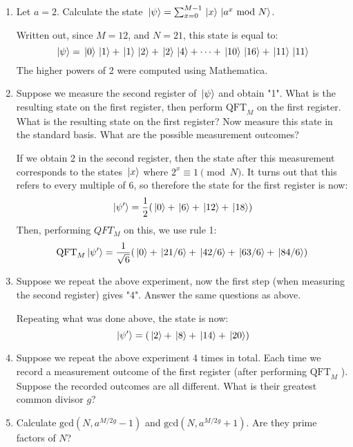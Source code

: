 \documentclass[10pt]{article}
\begin{document}
	\begin{enumerate}[label=\alph*)]
		\item Let \( a = 2 \). Calculate the state \( \ket*{\psi} = \sum_{x=0}^{M-1} \ket*{x} \ket*{a^{x} \ 
			\text{mod } N} \). 

			\begin{solution}
				Written out, since \( M = 12 \), and \( N = 21 \), this state is equal to:
				\[
					\ket*{\psi} = \ket*{0}\ket*{1} + \ket*{1}\ket*{2} + \ket*{2}\ket*{4} + \cdots + 
					\ket*{10}\ket*{16} + \ket*{11}\ket*{11}
				\] 
				The higher powers of 2 were computed using Mathematica. 
			\end{solution}
		\item Suppose we measure the second register of \( \ket*{\psi} \) and obtain "1". 
			What is the resulting state on the first register, then perform \( \text{QFT}_M \) on the first 
			register. What is the resulting state on the first register? Now measure this state in the standard 
			basis. What are the possible measurement outcomes? 

			\begin{solution}
				If we obtain 2 in the second register, then the state after this measurement corresponds to the states 
				\( \ket*{x} \) where \( 2^{x} \equiv 1 \pmod N \). It turns out that this refers to every multiple 
				of \( 6 \), so therefore the state for the first register is now:
				\[
				\ket*{\psi'} = \frac{1}{2}(\ket*{0} + \ket*{6} + \ket*{12} + \ket*{18})
				\] 
				Then, performing \( QFT_M \) on this, we use rule 1: 
				\[
				\text{QFT}_M\ket*{\psi'} = \frac{1}{\sqrt{6} }(\ket*{0} + \ket*{21 / 6} + \ket*{42/6} + 
				\ket*{63 / 6} + \ket*{84 / 6})
				\] 
			\end{solution}
		\item Suppose we repeat the above experiment, now the first step (when measuring the second register) gives "4".
			Answer the same questions as above. 

			\begin{solution}
				Repeating what was done above, the state is now:
				\[
				\ket*{\psi'} = (\ket*{2} + \ket*{8} + \ket*{14} + \ket*{20})
				\] 
			\end{solution}
		\item Suppose we repeat the above experiment 4 times in total. Each time we record a measurement outcome of
			the first register (after performing \( \text{QFT}_M \) ). Suppose the recorded outcomes are all different.
			What is their greatest common divisor \( g \)?
		\item Calculate \( \mathrm{gcd}(N, a^{M / 2g} - 1) \) and \( \mathrm{gcd}(N, a^{M / 2g} + 1) \). Are they 
			prime factors of \( N \)? 
	\end{enumerate}
	\pagebreak
\end{document}
